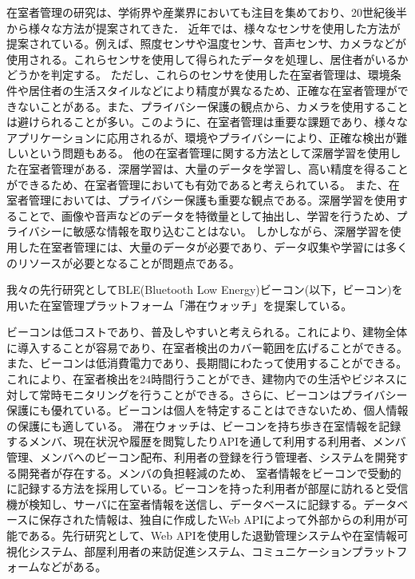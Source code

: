 在室者管理の研究は、学術界や産業界においても注目を集めており、20世紀後半から様々な方法が提案されてきた．
近年では、様々なセンサを使用した方法が提案されている。例えば、照度センサや温度センサ、音声センサ、カメラなどが使用される。これらセンサを使用して得られたデータを処理し、居住者がいるかどうかを判定する。
ただし、これらのセンサを使用した在室者管理は、環境条件や居住者の生活スタイルなどにより精度が異なるため、正確な在室者管理ができないことがある。また、プライバシー保護の観点から、カメラを使用することは避けられることが多い。このように、在室者管理は重要な課題であり、様々なアプリケーションに応用されるが、環境やプライバシーにより、正確な検出が難しいという問題もある。
他の在室者管理に関する方法として深層学習を使用した在室者管理がある．深層学習は、大量のデータを学習し、高い精度を得ることができるため、在室者管理においても有効であると考えられている。
また、在室者管理においては、プライバシー保護も重要な観点である。深層学習を使用することで、画像や音声などのデータを特徴量として抽出し、学習を行うため、プライバシーに敏感な情報を取り込むことはない。
しかしながら、深層学習を使用した在室者管理には、大量のデータが必要であり、データ収集や学習には多くのリソースが必要となることが問題点である。

我々の先行研究としてBLE(Bluetooth Low Energy)ビーコン(以下，ビーコン)を用いた在室管理プラットフォーム「滞在ウォッチ」を提案している。


ビーコンは低コストであり、普及しやすいと考えられる。これにより、建物全体に導入することが容易であり、在室者検出のカバー範囲を広げることができる。また、ビーコンは低消費電力であり、長期間にわたって使用することができる。これにより、在室者検出を24時間行うことができ、建物内での生活やビジネスに対して常時モニタリングを行うことができる。さらに、ビーコンはプライバシー保護にも優れている。ビーコンは個人を特定することはできないため、個人情報の保護にも適している。
滞在ウォッチは、ビーコンを持ち歩き在室情報を記録するメンバ、現在状況や履歴を閲覧したりAPIを通して利用する利用者、メンバ管理、メンバへのビーコン配布、利用者の登録を行う管理者、システムを開発する開発者が存在する。メンバの負担軽減のため、
室者情報をビーコンで受動的に記録する方法を採用している。ビーコンを持った利用者が部屋に訪れると受信機が検知し、サーバに在室者情報を送信し、データベースに記録する。データベースに保存された情報は、独自に作成したWeb APIによって外部からの利用が可能である。先行研究として、Web APIを使用した退勤管理システムや在室情報可視化システム、部屋利用者の来訪促進システム、コミュニケーションプラットフォームなどがある。


